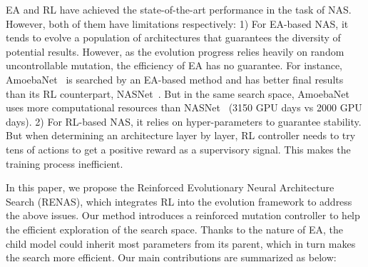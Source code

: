 \documentclass[10pt,twocolumn,letterpaper]{article}
\begin{document}


EA and RL have achieved the state-of-the-art performance in the task of NAS. %
However, both of them have limitations respectively:
1) For EA-based NAS, it tends to evolve a population of architectures that guarantees the diversity of potential results. However, as the evolution progress relies heavily on random uncontrollable mutation, the efficiency of EA has no guarantee. For instance, AmoebaNet~\cite{Real2018Regularized} is searched by an EA-based method and has better final results than its RL counterpart, NASNet~\cite{zoph2017learning}. But in the same search space, AmoebaNet~\cite{Real2018Regularized} uses more computational resources than NASNet~\cite{zoph2017learning} (3150 GPU days vs 2000 GPU days).
2) For RL-based NAS, it relies on hyper-parameters to guarantee stability.
But when determining an architecture layer by layer, RL controller needs to try tens of actions to get a positive reward as a supervisory signal. This makes the training process inefficient.

In this paper, we propose the Reinforced Evolutionary Neural Architecture Search (RENAS), which integrates RL into the evolution framework to address the above issues. Our method introduces a reinforced mutation controller to help the efficient exploration of the search space. Thanks to the nature of EA, the child model could inherit most parameters from its parent, which in turn makes the search more efficient. Our main contributions are summarized as below:

\end{document}
